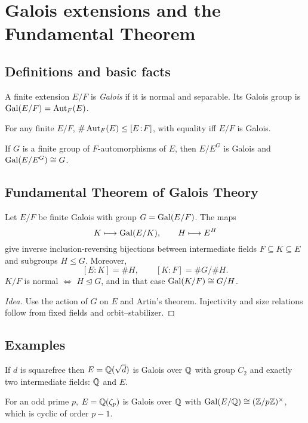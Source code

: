 \section{Galois extensions and the Fundamental Theorem}\label{sec:galois-ft}

\subsection{Definitions and basic facts}
\begin{definition}
A finite extension $E/F$ is \emph{Galois} if it is normal and separable. Its Galois group is $\operatorname{Gal}(E/F)=\operatorname{Aut}_F(E)$.
\end{definition}
\begin{theorem}[Counting]
For any finite $E/F$, $\#\operatorname{Aut}_F(E)\le [E\!:\!F]$, with equality iff $E/F$ is Galois.
\end{theorem}
\begin{theorem}[Artin]
If $G$ is a finite group of $F$-automorphisms of $E$, then $E/E^G$ is Galois and $\operatorname{Gal}(E/E^G)\cong G$.
\end{theorem}

\subsection{Fundamental Theorem of Galois Theory}
\begin{theorem}
Let $E/F$ be finite Galois with group $G=\operatorname{Gal}(E/F)$. The maps
\[
K\longmapsto \operatorname{Gal}(E/K),\qquad
H\longmapsto E^H
\]
give inverse inclusion-reversing bijections between intermediate fields $F\subseteq K\subseteq E$ and subgroups $H\le G$. Moreover,
\[
[E\!:\!K]=\#H,\qquad [K\!:\!F]=\#G/\#H.
\]
$K/F$ is normal $\iff$ $H\trianglelefteq G$, and in that case $\operatorname{Gal}(K/F)\cong G/H$.
\end{theorem}
\begin{proof}[Idea]
Use the action of $G$ on $E$ and Artin's theorem. Injectivity and size relations follow from fixed fields and orbit--stabilizer.
\end{proof}

\subsection{Examples}
\begin{example}[Quadratic]
If $d$ is squarefree then $E=\mathbb{Q}(\sqrt d)$ is Galois over $\mathbb{Q}$ with group $C_2$ and exactly two intermediate fields: $\mathbb{Q}$ and $E$.
\end{example}
\begin{example}
For an odd prime $p$, $E=\mathbb{Q}(\zeta_p)$ is Galois over $\mathbb{Q}$ with $\operatorname{Gal}(E/\mathbb{Q})\cong (\mathbb{Z}/p\mathbb{Z})^\times$, which is cyclic of order $p-1$.
\end{example}
